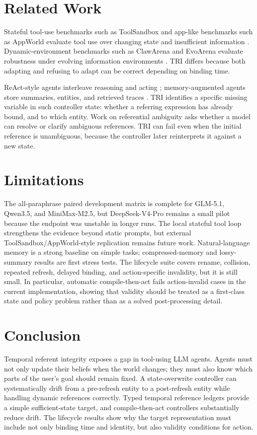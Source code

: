 \documentclass[letterpaper]{article}
\begin{document}
\section{Related Work}

Stateful tool-use benchmarks such as ToolSandbox and app-like benchmarks such as AppWorld evaluate tool use over changing state and insufficient information \cite{lu2024toolsandbox,trivedi2024appworld}. Dynamic-environment benchmarks such as ClawArena and EvoArena evaluate robustness under evolving information environments \cite{ji2026clawarena,xu2026evoarena}. TRI differs because both adapting and refusing to adapt can be correct depending on binding time.

ReAct-style agents interleave reasoning and acting \cite{yao2022react}; memory-augmented agents store summaries, entities, and retrieved traces \cite{zhang2024memorysurvey,bousetouane2026memorycontrol}. TRI identifies a specific missing variable in such controller state: whether a referring expression has already bound, and to which entity. Work on referential ambiguity asks whether a model can resolve or clarify ambiguous references. TRI can fail even when the initial reference is unambiguous, because the controller later reinterprets it against a new state.

\section{Limitations}

The all-paraphrase paired development matrix is complete for GLM-5.1, Qwen3.5, and MiniMax-M2.5, but DeepSeek-V4-Pro remains a small pilot because the endpoint was unstable in longer runs. The local stateful tool loop strengthens the evidence beyond static prompts, but external ToolSandbox/AppWorld-style replication remains future work. Natural-language memory is a strong baseline on simple tasks; compressed-memory and lossy-summary results are first stress tests. The lifecycle suite covers rename, collision, repeated refresh, delayed binding, and action-specific invalidity, but it is still small. In particular, automatic compile-then-act fails action-invalid cases in the current implementation, showing that validity should be treated as a first-class state and policy problem rather than as a solved post-processing detail.

\section{Conclusion}

Temporal referent integrity exposes a gap in tool-using LLM agents. Agents must not only update their beliefs when the world changes; they must also know which parts of the user's goal should remain fixed. A state-overwrite controller can systematically drift from a pre-refresh entity to a post-refresh entity while handling dynamic references correctly. Typed temporal reference ledgers provide a simple sufficient-state target, and compile-then-act controllers substantially reduce drift. The lifecycle results show why the target representation must include not only binding time and identity, but also validity conditions for action.


\end{document}
